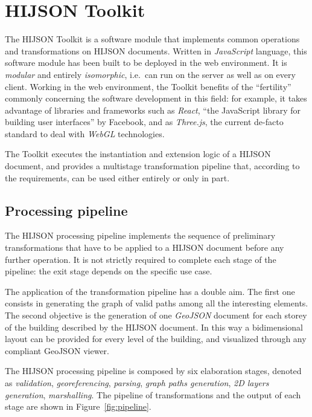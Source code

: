 
\section{HIJSON Toolkit}\label{toolkit}

The HIJSON Toolkit is a software module that implements common
operations and transformations on HIJSON documents. Written in
\emph{JavaScript} language, this software module has been built to be deployed in the web
environment. It is \emph{modular} and entirely \emph{isomorphic},
i.e.~can run on the server as well as on every client. Working in the
web environment, the Toolkit benefits of the ``fertility'' commonly concerning the
software development in this field: for example, it takes advantage of libraries and
frameworks such as \emph{React}, ``the JavaScript library for building
user interfaces'' by Facebook, and as \emph{Three.js}, the current de-facto standard to deal
with \emph{WebGL} technologies.

The Toolkit executes the instantiation and extension logic of a HIJSON
document, and provides a multistage transformation pipeline that, according to the requirements,
can be used either entirely or only in part.

\subsection{Processing pipeline}\label{hijson-processing-pipeline}

The HIJSON processing pipeline implements the sequence of preliminary
transformations that have to be applied to a HIJSON document before any
further operation. It is not strictly required to complete each stage of
the pipeline: the exit stage depends on the specific use case.

The application of the transformation pipeline has a double aim. The first one
consists in generating the graph of valid paths among all the interesting
elements. The second objective is the generation of one \emph{GeoJSON}
document for each storey of the building described by the HIJSON document. In
this way a bidimensional layout  can be provided for every level of the building, 
and visualized through any compliant GeoJSON viewer.

The HIJSON processing pipeline is composed by six elaboration stages, denoted
as \emph{validation}, \emph{georeferencing}, \emph{parsing}, \emph{graph paths
generation}, \emph{2D layers generation}, \emph{marshalling}. The pipeline of
transformations and the output of each stage are shown in
Figure~\ref{fig:pipeline}.

